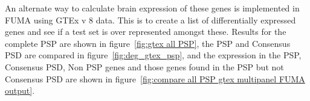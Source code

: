 An alternate way to calculate brain expression of these genes is implemented in FUMA using GTEx v 8 data. This is to create a list of differentially expressed genes and see if a test set is over represented amongst these. Results for the complete PSP are shown in figure~\ref{fig:gtex all PSP}, the PSP and Consensus PSD are compared in figure~\ref{fig:deg_gtex_psp}, and the expression in the PSP, Consensus PSD, Non PSP genes and those genes found in the PSP but not Consensus PSD are shown in figure~\ref{fig:compare all PSP gtex multipanel FUMA output}. 




 








